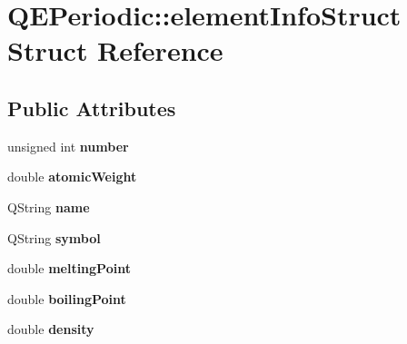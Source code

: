 \hypertarget{structQEPeriodic_1_1elementInfoStruct}{
\section{QEPeriodic::elementInfoStruct Struct Reference}
\label{structQEPeriodic_1_1elementInfoStruct}
}
\subsection*{Public Attributes}
\begin{DoxyCompactItemize}
\item 
\hypertarget{structQEPeriodic_1_1elementInfoStruct_a2ed6f5ccfa01f9c05336709d0fe7d22b}{
unsigned int {\bfseries number}}
\label{structQEPeriodic_1_1elementInfoStruct_a2ed6f5ccfa01f9c05336709d0fe7d22b}

\item 
\hypertarget{structQEPeriodic_1_1elementInfoStruct_adac6b95485680936540fde9b1ce357cd}{
double {\bfseries atomicWeight}}
\label{structQEPeriodic_1_1elementInfoStruct_adac6b95485680936540fde9b1ce357cd}

\item 
\hypertarget{structQEPeriodic_1_1elementInfoStruct_a53d312c3b9e5a47ba5c8657f16e5c0e6}{
QString {\bfseries name}}
\label{structQEPeriodic_1_1elementInfoStruct_a53d312c3b9e5a47ba5c8657f16e5c0e6}

\item 
\hypertarget{structQEPeriodic_1_1elementInfoStruct_afbc2ae5bc1e94552f4ce9fa209ba052d}{
QString {\bfseries symbol}}
\label{structQEPeriodic_1_1elementInfoStruct_afbc2ae5bc1e94552f4ce9fa209ba052d}

\item 
\hypertarget{structQEPeriodic_1_1elementInfoStruct_a264cba29d4c938d5e95896d34d220eea}{
double {\bfseries meltingPoint}}
\label{structQEPeriodic_1_1elementInfoStruct_a264cba29d4c938d5e95896d34d220eea}

\item 
\hypertarget{structQEPeriodic_1_1elementInfoStruct_aa12a2085c11e772e4ef4b3d2809ab56f}{
double {\bfseries boilingPoint}}
\label{structQEPeriodic_1_1elementInfoStruct_aa12a2085c11e772e4ef4b3d2809ab56f}

\item 
\hypertarget{structQEPeriodic_1_1elementInfoStruct_ae353fbd57ff732b6f21d50b6cf83c33c}{
double {\bfseries density}}
\label{structQEPeriodic_1_1elementInfoStruct_ae353fbd57ff732b6f21d50b6cf83c33c}


\end{DoxyCompactItemize}
